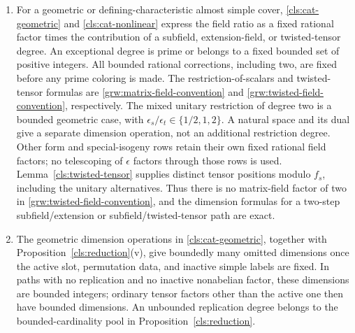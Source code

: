 \begin{enumerate}[label=\textup{(G\arabic*)},ref=G\arabic*]
\item\label{grw:input-fields}
For a geometric or defining-characteristic almost simple cover,
\ref{cls:cat-geometric} and \ref{cls:cat-nonlinear} express the field
ratio as a fixed rational factor times the contribution of a subfield,
extension-field, or twisted-tensor degree. An exceptional degree is
prime or belongs to a fixed bounded set of positive integers.
All bounded rational corrections, including two, are fixed before
any prime coloring is made. The restriction-of-scalars and
twisted-tensor formulas are \eqref{grw:matrix-field-convention}
and \eqref{grw:twisted-field-convention}, respectively.
The mixed unitary restriction of degree two is a bounded geometric
case, with $\epsilon_s/\epsilon_t\in\{1/2,1,2\}$.
A natural space and its dual give a separate dimension operation,
not an additional restriction degree. Other form and special-isogeny
rows retain their own fixed rational field factors; no telescoping
of $\epsilon$ factors through those rows is used.
Lemma~\ref{cls:twisted-tensor} supplies distinct tensor positions
modulo $f_s$, including the unitary alternatives. Thus there is no
matrix-field factor of two in \eqref{grw:twisted-field-convention},
and the dimension formulas for a two-step subfield/extension or
subfield/twisted-tensor path are exact.

\item\label{grw:input-geometric}
The geometric dimension operations in \ref{cls:cat-geometric},
together with Proposition~\ref{cls:reduction}(v), give boundedly
many omitted dimensions once the active slot, permutation data,
and inactive simple labels are fixed. In paths with no replication
and no inactive nonabelian factor, these dimensions are bounded
integers; ordinary tensor factors other than the active one then
have bounded dimensions. An unbounded replication degree belongs
to the bounded-cardinality pool in Proposition~\ref{cls:reduction}.


\end{enumerate}
